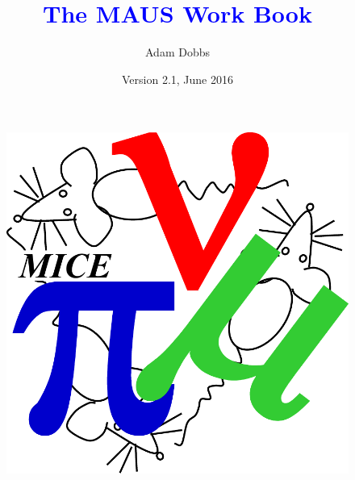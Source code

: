 \documentclass[a4paper,10pt]{article}
\title{\textcolor{blue}{The MAUS Work Book}}
\author{Adam Dobbs}
\date{Version 2.1, June 2016}
\begin{document}
\thispagestyle{empty}

\vspace*{1cm}

{\let\newpage\relax\maketitle}

\reversemarginpar

\thispagestyle{empty}
\vspace{2cm}

\begin{figure}[h]
 \begin{center}
   \includegraphics[width=0.29\linewidth]{./graphics/mice-logo.pdf}
 \end{center}
\end{figure}

\vspace{5cm}

\pagebreak

\tableofcontents

\pagebreak
\end{document}
